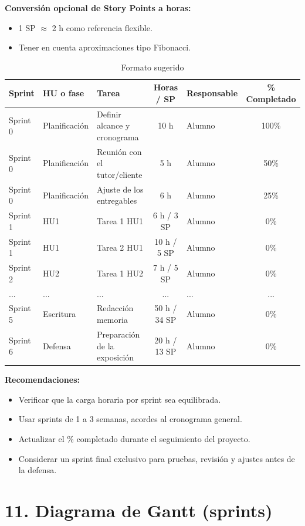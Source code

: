 \documentclass[
11pt, %
]{charter}
\begin{document}
\textbf{Conversión opcional de Story Points a horas:}
\begin{itemize}
  \item 1 SP \(\approx\) 2 h como referencia flexible.
  \item Tener en cuenta aproximaciones tipo Fibonacci.
\end{itemize}

\begin{table}[htpb]
\centering
\caption{Formato sugerido}
\begin{tabularx}{\linewidth}{@{}|l|l|X|c|l|c|@{}}
\hline
\rowcolor[HTML]{C0C0C0}
Sprint & HU o fase & Tarea & Horas / SP & Responsable & \% Completado \\ \hline
Sprint 0 & Planificación & Definir alcance y cronograma & 10 h & Alumno & 100\% \\ \hline
Sprint 0 & Planificación & Reunión con el tutor/cliente & 5 h & Alumno & 50\% \\ \hline
Sprint 0 & Planificación & Ajuste de los entregables & 6 h & Alumno & 25\% \\ \hline
Sprint 1 & HU1 & Tarea 1 HU1 & 6 h / 3 SP & Alumno & 0\% \\ \hline
Sprint 1 & HU1 & Tarea 2 HU1 & 10 h / 5 SP & Alumno & 0\% \\ \hline
Sprint 2 & HU2 & Tarea 1 HU2 & 7 h / 5 SP & Alumno & 0\% \\ \hline
... & ... & ... & ... & ... & ... \\ \hline
Sprint 5 & Escritura & Redacción memoria & 50 h / 34 SP & Alumno & 0\% \\ \hline
Sprint 6 & Defensa & Preparación de la exposición & 20 h / 13 SP & Alumno & 0\% \\ \hline
\end{tabularx}
\end{table}

\textbf{Recomendaciones:}
\begin{itemize}
  \item Verificar que la carga horaria por sprint sea equilibrada.
  \item Usar sprints de 1 a 3 semanas, acordes al cronograma general.
  \item Actualizar el \% completado durante el seguimiento del proyecto.
  \item Considerar un sprint final exclusivo para pruebas, revisión y ajustes antes de la defensa.
\end{itemize}


\section{11. Diagrama de Gantt (sprints)}
\label{sec:gantt}
\end{document}
